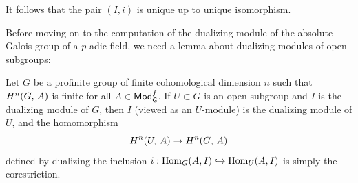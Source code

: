 \documentclass[a4paper, oneside]{memoir}
\begin{document}
\begin{corollary}
    It follows that the pair \((I,i)\) is unique up to unique isomorphism.
\end{corollary}

Before moving on to the computation of the dualizing module of the absolute Galois group of a \(p\)-adic field, we need a lemma about dualizing modules of open subgroups:

\begin{lemma}\label{lm:DualOpenSgr}
    Let \(G\) be a profinite group of finite cohomological dimension \(n\) such that \(H^{n}( G, \, A )\) is finite for all \(A\in\mathsf{Mod}_{\mathsf{G}}^f\). If \(U\subset G\) is an open subgroup and \(I\) is the dualizing module of \(G\), then \(I\) (viewed as an \(U\)-module) is the dualizing module of \(U\), and the homomorphism
    \[
        H^{n}( U, \, A )\to H^{n}( G, \, A )
    \]
    defined by dualizing the inclusion \(i:\operatorname{Hom}_G(A,I) \hookrightarrow \operatorname{Hom}_U(A,I) \) is simply the corestriction.
\end{lemma}
\end{document}
